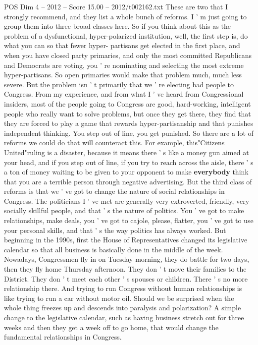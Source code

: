 \begin{textsample}{POS Dim 4 – 2012 – Score 15.00 – 2012/t002162.txt}
These are two that I strongly recommend, and they list a whole bunch of reforms.
I ' m just going to group them into three broad classes here.
So if you think about this as the problem of a dysfunctional, hyper-polarized institution, well, the first step is, do what you can so that fewer hyper- partisans get elected in the first place, and when you have closed party primaries, and only the most committed Republicans and Democrats are voting, you ' re nominating and selecting the most extreme hyper-partisans.
So open primaries would make that problem much, much less severe.
But the problem isn ' t primarily that we ' re electing bad people to Congress.
From my experience, and from what I ' ve heard from Congressional insiders, most of the people going to Congress are good, hard-working, intelligent people who really want to solve problems, but once they get there, they find that they are forced to play a game that rewards hyper-partisanship and that punishes independent thinking.
You step out of line, you get punished.
So there are a lot of reforms we could do that will counteract this.
For example, this"Citizens United"ruling is a disaster, because it means there ' s like a money gun aimed at your head, and if you step out of line, if you try to reach across the aisle, there ' s a ton of money waiting to be given to your opponent to make \textbf{everybody} think that you are a terrible person through negative advertising.
But the third class of reforms is that we ' ve got to change the nature of social relationships in Congress.
The politicians I ' ve met are generally very extroverted, friendly, very socially skillful people, and that ' s the nature of politics.
You ' ve got to make relationships, make deals, you ' ve got to cajole, please, flatter, you ' ve got to use your personal skills, and that ' s the way politics has always worked.
But beginning in the 1990s, first the House of Representatives changed its legislative calendar so that all business is basically done in the middle of the week.
Nowadays, Congressmen fly in on Tuesday morning, they do battle for two days, then they fly home Thursday afternoon.
They don ' t move their families to the District.
They don ' t meet each other ' s spouses or children.
There ' s no more relationship there.
And trying to run Congress without human relationships is like trying to run a car without motor oil.
Should we be surprised when the whole thing freezes up and descends into paralysis and polarization?
A simple change to the legislative calendar, such as having business stretch out for three weeks and then they get a week off to go home, that would change the fundamental relationships in Congress.

\end{textsample}
